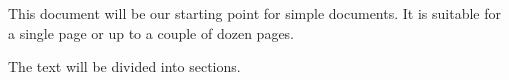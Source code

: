 \documentclass[paper=a4,oneside,fontsize=11pt,
  parskip=full]{scrartcl}
\begin{document}
This document will be our starting point for simple
documents.
It is suitable for a single page or up to
a couple of dozen pages.

The text will be divided into sections.
\end{document}
